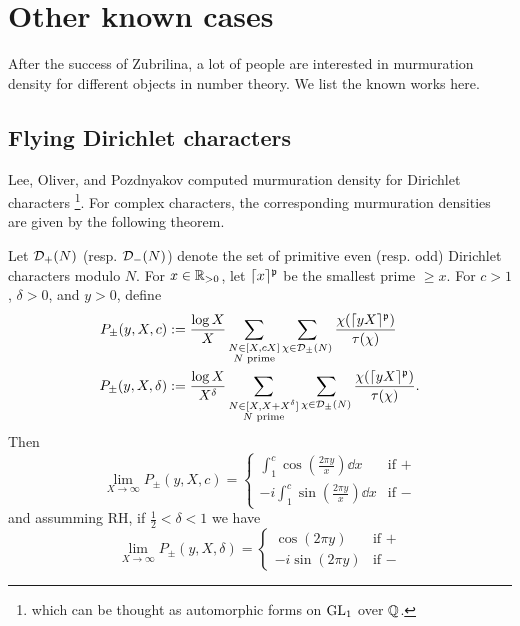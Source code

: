 \section{Other known cases}

After the success of Zubrilina, a lot of people are interested in murmuration density for different objects in number theory.
We list the known works here.

\subsection{Flying Dirichlet characters}

Lee, Oliver, and Pozdnyakov computed murmuration density for Dirichlet characters \cite{lee2025murmurations}\footnote{which can be thought as  automorphic forms on $\mathrm{GL}_1$ over $\mathbb{Q}$.}.
For complex characters, the corresponding murmuration densities are given by the following theorem.

\begin{theorem}
    Let $\mathcal{D}_{+}(N)$ (resp. $\mathcal{D}_{-}(N)$) denote the set of primitive even (resp. odd) Dirichlet characters modulo $N$.
    For $x \in \mathbb{R}_{> 0}$, let $\lceil x \rceil^{\mathfrak{p}}$ be the smallest prime $\ge x$.
    For $c > 1$, $\delta > 0$, and $y > 0$, define
    \begin{align*}
        P_{\pm}(y, X, c) &:= \frac{\log X}{X} \sum_{\substack{N \in [X, cX] \\ N \text{ prime}}} \sum_{\chi \in \mathcal{D}_{\pm}(N)} \frac{\chi(\lceil yX \rceil^{\mathfrak{p}})}{\tau(\chi)} \\
        P_{\pm}(y, X, \delta) &:= \frac{\log X}{X^\delta} \sum_{\substack{N \in [X, X + X^\delta] \\ N \text{ prime}}} \sum_{\chi \in \mathcal{D}_{\pm}(N)} \frac{\chi(\lceil yX \rceil^{\mathfrak{p}})}{\tau(\chi)}.
    \end{align*}
    Then
    \begin{equation}
        \label{eqn:lee_1}
        \lim_{X \to \infty} P_{\pm} (y, X, c) = \begin{cases}
            \int_{1}^{c} \cos\left(\frac{2 \pi y}{x}\right) \dd x & \text{if } + \\
            -i \int_{1}^{c} \sin \left(\frac{2 \pi y}{x}\right) \dd x & \text{if } -
        \end{cases}
    \end{equation}
    and assumming RH, if $\frac{1}{2} < \delta < 1$ we have
    \begin{equation}
        \label{eqn:lee_2}
        \lim_{X \to \infty} P_{\pm} (y, X, \delta) = \begin{cases}
            \cos (2 \pi y) & \text{if } + \\
            -i \sin (2 \pi y) & \text{if } -
        \end{cases}
    \end{equation}
\end{theorem}

